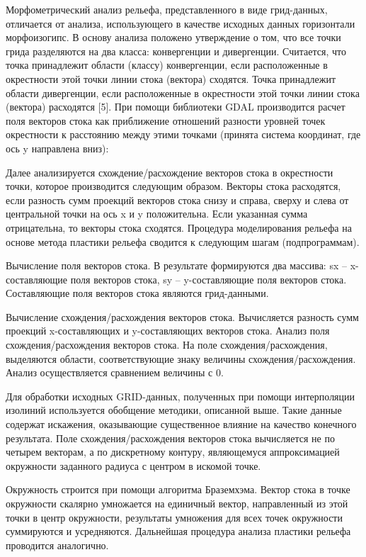 \documentclass[runningheads]{AIIT}
\begin{document}
Морфометрический анализ рельефа, представленного в виде грид-данных, отличается от анализа, использующего в качестве исходных данных горизонтали морфоизогипс. В основу анализа положено утверждение о том, что все точки грида разделяются на два класса: конвергенции и дивергенции. Считается, что точка принадлежит области (классу) конвергенции, если расположенные в окрестности этой точки линии стока (вектора) сходятся. Точка принадлежит области дивергенции, если расположенные в окрестности этой точки линии стока (вектора) расходятся [5].
При помощи библиотеки GDAL производится расчет поля векторов стока как приближение отношений разности уровней точек окрестности к расстоянию между этими точками (принята система координат, где ось y направлена вниз):








Далее анализируется схождение/расхождение векторов стока в окрестности точки, которое производится следующим образом. Векторы стока расходятся, если разность сумм проекций векторов стока снизу и справа, сверху и слева от центральной точки на ось x и y положительна. Если указанная сумма отрицательна, то векторы стока сходятся.
Процедура моделирования рельефа на основе метода пластики рельефа сводится к следующим шагам (подпрограммам).

Вычисление поля векторов стока. В результате формируются два массива: sx – x-составляющие поля векторов стока, sy – y-составляющие поля векторов стока. Составляющие поля векторов стока являются грид-данными.

Вычисление схождения/расхождения векторов стока. Вычисляется разность сумм проекций x-составляющих и y-составляющих векторов стока.
Анализ поля схождения/расхождения векторов стока. На поле схождения/расхождения, выделяются области, соответствующие знаку величины схождения/расхождения. Анализ осуществляется сравнением величины с 0.

Для обработки исходных GRID-данных, полученных при помощи интерполяции изолиний используется обобщение методики, описанной выше. Такие данные содержат искажения, оказывающие существенное влияние на качество конечного результата. Поле схождения/расхождения векторов стока вычисляется не по четырем векторам, а по дискретному контуру, являющемуся аппроксимацией окружности заданного радиуса с центром в искомой точке.

Окружность строится при помощи алгоритма Браземхэма. Вектор стока в точке окружности скалярно умножается на единичный вектор, направленный из этой точки в центр окружности, результаты умножения для всех точек окружности суммируются и усредняются. Дальнейшая процедура анализа пластики рельефа проводится аналогично.
\end{document}
